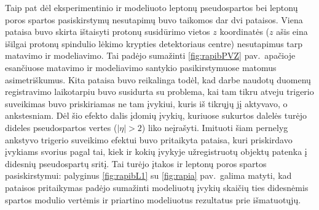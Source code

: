 \documentclass[a4paper, 12pt]{article}
\begin{document}
\vspace{-0.9cm}
\vspace{0.5cm}


Taip pat dėl eksperimentinio ir modeliuoto leptonų pseudospartos bei leptonų poros spartos pasiskirstymų nesutapimų
buvo taikomos dar dvi pataisos.
Viena pataisa buvo skirta ištaisyti protonų susidūrimo vietos $z$ koordinatės ($z$ ašis eina išilgai protonų
spindulio lėkimo krypties detektoriaus centre) nesutapimus tarp matavimo ir modeliavimo.
Tai padėjo sumažinti \ref{fig:rapibPVZ} pav.\ apačioje esančiuose matavimo ir modeliavimo santykio pasikirstymuose
matomus asimetriškumus.
Kita pataisa buvo reikalinga todėl, kad darbe naudotų duomenų registravimo laikotarpiu buvo susidurta su problema,
kai tam tikru atveju trigerio suveikimas buvo priskiriamas ne tam įvykiui, kuris iš tikrųjų jį aktyvavo, o
ankstesniam.
Dėl šio efekto dalis įdomių įvykių, kuriuose sukurtos dalelės turėjo dideles pseudospartos vertes ($|\eta|>2$)
liko neįrašyti.
Imituoti šiam pernelyg ankstyvo trigerio suveikimo efektui buvo pritaikyta pataisa, kuri priskirdavo įvykiams
svorius pagal tai, kiek ir kokių įvykyje užregistruotų objektų patenka į didesnių pseudospartų sritį.
Tai turėjo įtakos ir leptonų poros spartos pasiskirstymui: palyginus \ref{fig:rapibL1} su \ref{fig:rapia} pav.\
galima matyti, kad pataisos pritaikymas padėjo sumažinti modeliuotų įvykių skaičių ties didesnėmis spartos modulio
vertėmis ir priartino modeliuotus rezultatus prie išmatuotųjų.
\end{document}
